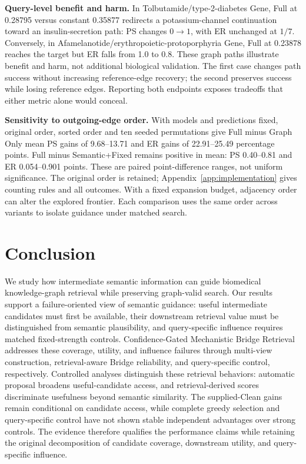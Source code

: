 \documentclass{article} %
\newcommand{\rev}[1]{{\color{blue}#1}}
\begin{document}
\noindent\textbf{Query-level benefit and harm.}
In Tolbutamide/type-2-diabetes Gene, Full at 0.28795 versus constant 0.35877 redirects a potassium-channel continuation toward an insulin-secretion path: \rev{PS changes $0\rightarrow1$, with ER unchanged at $1/7$}. Conversely, in Afamelanotide/erythropoietic-protoporphyria Gene, Full at 0.23878 reaches the target but \rev{ER falls from 1.0 to 0.8}. These graph paths illustrate benefit and harm, not additional biological validation. The first case changes path success without increasing reference-edge recovery; the second preserves success while losing reference edges. Reporting both endpoints exposes tradeoffs that either metric alone would conceal.

\noindent\textbf{Sensitivity to outgoing-edge order.}
With models and predictions fixed, original order, sorted order and ten seeded permutations give Full minus Graph Only mean \rev{PS gains of 9.68--13.71 and ER gains of 22.91--25.49 percentage points}. Full minus Semantic+Fixed remains positive in mean: \rev{PS 0.40--0.81 and ER 0.054--0.901 points}. These are paired point-difference ranges, not uniform significance. The original order is retained; Appendix~\ref{app:implementation} gives counting rules and all outcomes. With a fixed expansion budget, adjacency order can alter the explored frontier. Each comparison uses the same order across variants to isolate guidance under matched search.

\vspace{0.45em}
\vspace{-8pt}
\section{Conclusion}
We study how intermediate semantic information can guide biomedical
knowledge-graph retrieval while preserving graph-valid search. Our results
support a failure-oriented view of semantic guidance: useful intermediate
candidates must first be available, their downstream retrieval value must be
distinguished from semantic plausibility, and \rev{query-specific influence requires
matched fixed-strength controls}. Confidence-Gated Mechanistic Bridge Retrieval addresses these
coverage, utility, and influence failures through multi-view construction,
retrieval-aware Bridge reliability, and query-specific control, respectively.
\rev{Controlled analyses distinguish these retrieval behaviors: automatic proposal broadens useful-candidate access, and retrieval-derived scores discriminate usefulness beyond semantic similarity. The supplied-Clean gains remain conditional on candidate access, while complete greedy selection and query-specific control have not shown stable independent advantages over strong controls. The evidence therefore qualifies the performance claims while retaining the original decomposition of candidate coverage, downstream utility, and query-specific influence.}
\end{document}
